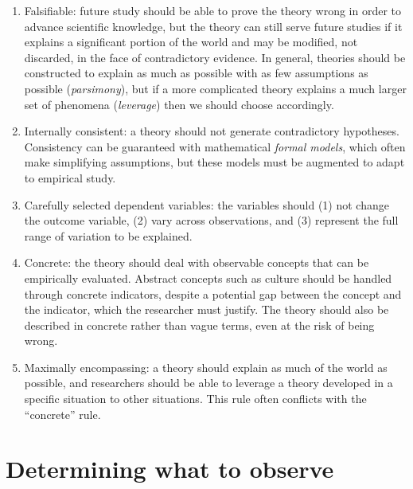 \documentclass[11pt,letterpaper]{article}
\begin{document}
\begin{itemize}
\begin{enumerate}
\item Falsifiable: future study should be able to prove the theory wrong in order to advance scientific knowledge, but the theory can still serve future studies if it explains a significant portion of the world and may be modified, not discarded, in the face of contradictory evidence. In general, theories should be constructed to explain as much as possible with as few assumptions as possible (\emph{parsimony}), but if a more complicated theory explains a much larger set of phenomena (\emph{leverage}) then we should choose accordingly.
\item Internally consistent: a theory should not generate contradictory hypotheses. Consistency can be guaranteed with mathematical \emph{formal models}, which often make simplifying assumptions, but these models must be augmented to adapt to empirical study. 
\item Carefully selected dependent variables: the variables should (1) not change the outcome variable, (2) vary across observations, and (3) represent the full range of variation to be explained.
\item Concrete: the theory should deal with observable concepts that can be empirically evaluated. Abstract concepts such as culture should be handled through concrete indicators, despite a potential gap between the concept and the indicator, which the researcher must justify. The theory should also be described in concrete rather than vague terms, even at the risk of being wrong.
\item Maximally encompassing: a theory should explain as much of the world as possible, and researchers should be able to leverage a theory developed in a specific situation to other situations. This rule often conflicts with the ``concrete'' rule.
\end{enumerate}
\end{itemize}

\section{Determining what to observe}
\end{document}
